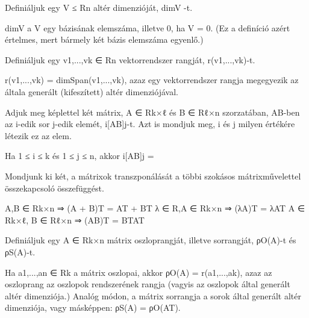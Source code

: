 \begin{frame}
  \begin{tcolorbox}[title={10}]
     Deﬁniáljuk egy V ≤ Rn altér dimenzióját, dimV -t.

  \tcblower
dimV a V egy bázisának elemszáma, illetve 0, ha V = {0}. (Ez a deﬁníció azért értelmes, mert bármely két bázis elemszáma egyenlő.)

  \end{tcolorbox}
\end{frame}



\begin{frame}
  \begin{tcolorbox}[title={11}]
   Deﬁniáljuk egy v1,...,vk ∈ Rn vektorrendszer rangját, r(v1,...,vk)-t.


  \tcblower
r(v1,...,vk) = dimSpan(v1,...,vk), azaz egy vektorrendszer rangja megegyezik az általa generált (kifeszített) altér dimenziójával.

  \end{tcolorbox}
\end{frame}


\begin{frame}
  \begin{tcolorbox}[title={12}]
    Adjuk meg képlettel két mátrix, A ∈ Rk×ℓ és B ∈ Rℓ×n szorzatában, AB-ben az i-edik sor j-edik elemét, i[AB]j-t. Azt is mondjuk meg, i és j milyen értékére létezik ez az elem.



  \tcblower
Ha 1 ≤ i ≤ k és 1 ≤ j ≤ n, akkor i[AB]j =
  \end{tcolorbox}
\end{frame}



\begin{frame}
  \begin{tcolorbox}[title={13}]
    Mondjunk ki két, a mátrixok transzponálását a többi szokásos mátrixművelettel összekapcsoló összefüggést.

  \tcblower
A,B ∈ Rk×n ⇒ (A + B)T = AT + BT λ ∈ R,A ∈ Rk×n ⇒ (λA)T = λAT A ∈ Rk×ℓ, B ∈ Rℓ×n ⇒ (AB)T = BTAT

  \end{tcolorbox}
\end{frame}



\begin{frame}
  \begin{tcolorbox}[title={14}]
    Deﬁniáljuk egy A ∈ Rk×n mátrix oszloprangját, illetve sorrangját, ρO(A)-t és ρS(A)-t.

  \tcblower
Ha a1,...,an ∈ Rk a mátrix oszlopai, akkor ρO(A) = r(a1,...,ak), azaz az oszloprang az oszlopok rendszerének rangja (vagyis az oszlopok által generált altér dimenziója.) Analóg módon, a mátrix sorrangja a sorok által generált altér dimenziója, vagy másképpen: ρS(A) = ρO(AT).

  \end{tcolorbox}
\end{frame}

